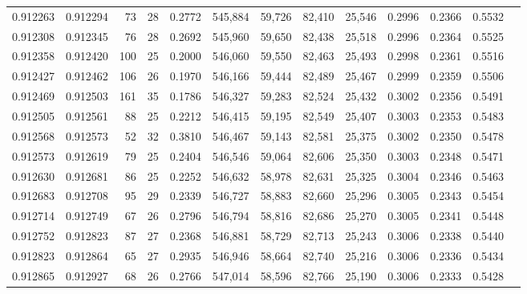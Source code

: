 \begin{tabular}{rrrrrrrrrrrrr}
0.912263 & 0.912294 &    73 &  28 &                                     0.2772 & 545,884 &  59,726 &  82,410 &  25,546 & 0.2996 & 0.2366 & 0.5532 \\
0.912308 & 0.912345 &    76 &  28 &                                     0.2692 & 545,960 &  59,650 &  82,438 &  25,518 & 0.2996 & 0.2364 & 0.5525 \\
0.912358 & 0.912420 &   100 &  25 &                                     0.2000 & 546,060 &  59,550 &  82,463 &  25,493 & 0.2998 & 0.2361 & 0.5516 \\
0.912427 & 0.912462 &   106 &  26 &                                     0.1970 & 546,166 &  59,444 &  82,489 &  25,467 & 0.2999 & 0.2359 & 0.5506 \\
0.912469 & 0.912503 &   161 &  35 &                                     0.1786 & 546,327 &  59,283 &  82,524 &  25,432 & 0.3002 & 0.2356 & 0.5491 \\
0.912505 & 0.912561 &    88 &  25 &                                     0.2212 & 546,415 &  59,195 &  82,549 &  25,407 & 0.3003 & 0.2353 & 0.5483 \\
0.912568 & 0.912573 &    52 &  32 &                                     0.3810 & 546,467 &  59,143 &  82,581 &  25,375 & 0.3002 & 0.2350 & 0.5478 \\
0.912573 & 0.912619 &    79 &  25 &                                     0.2404 & 546,546 &  59,064 &  82,606 &  25,350 & 0.3003 & 0.2348 & 0.5471 \\
0.912630 & 0.912681 &    86 &  25 &                                     0.2252 & 546,632 &  58,978 &  82,631 &  25,325 & 0.3004 & 0.2346 & 0.5463 \\
0.912683 & 0.912708 &    95 &  29 &                                     0.2339 & 546,727 &  58,883 &  82,660 &  25,296 & 0.3005 & 0.2343 & 0.5454 \\
0.912714 & 0.912749 &    67 &  26 &                                     0.2796 & 546,794 &  58,816 &  82,686 &  25,270 & 0.3005 & 0.2341 & 0.5448 \\
0.912752 & 0.912823 &    87 &  27 &                                     0.2368 & 546,881 &  58,729 &  82,713 &  25,243 & 0.3006 & 0.2338 & 0.5440 \\
0.912823 & 0.912864 &    65 &  27 &                                     0.2935 & 546,946 &  58,664 &  82,740 &  25,216 & 0.3006 & 0.2336 & 0.5434 \\
0.912865 & 0.912927 &    68 &  26 &                                     0.2766 & 547,014 &  58,596 &  82,766 &  25,190 & 0.3006 & 0.2333 & 0.5428 \\

\end{tabular}
